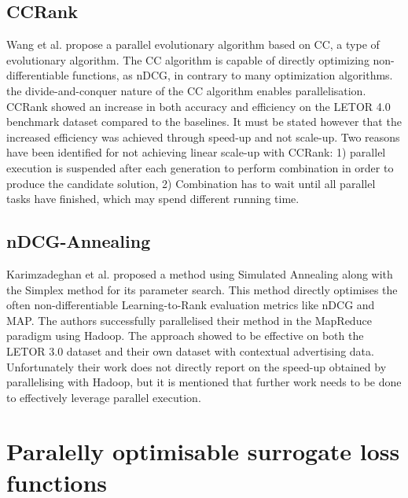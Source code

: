 \subsection{CCRank}
Wang et al. \cite{Wang2011a,Wang2011b} propose a parallel evolutionary algorithm based on \ac{CC}, a type of evolutionary algorithm. The \ac{CC} algorithm is capable of directly optimizing non-differentiable functions, as \ac{nDCG}, in contrary to many optimization algorithms.  the divide-and-conquer nature of the \ac{CC} algorithm enables parallelisation. CCRank showed an increase in both accuracy and efficiency on the LETOR 4.0 benchmark dataset compared to the baselines. It must be stated however that the increased efficiency was achieved through speed-up and not scale-up. Two reasons have been identified for not achieving linear scale-up with CCRank: 1) parallel execution is suspended after each generation to perform combination in order to produce the candidate solution, 2) Combination has to wait until all parallel tasks have finished, which may spend different running time.
\subsection{nDCG-Annealing}
Karimzadeghan et al. \cite{Karimzadehgan2011} proposed a method using Simulated Annealing along with the Simplex method for its parameter search. This method directly optimises the often non-differentiable Learning-to-Rank evaluation metrics like \ac{nDCG} and \ac{MAP}. The authors successfully parallelised their method in the MapReduce paradigm using Hadoop. The approach showed to be effective on both the LETOR 3.0 dataset and their own dataset with contextual advertising data. Unfortunately their work does not directly report on the speed-up obtained by parallelising  with Hadoop, but it is mentioned that further work needs to be done to effectively leverage parallel execution.\\

\section{Paralelly optimisable surrogate loss functions}
